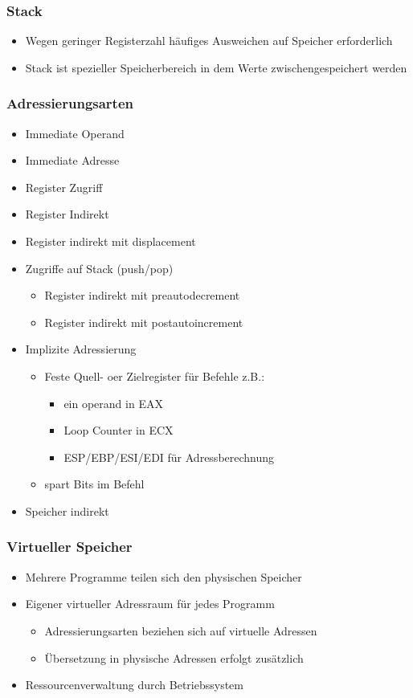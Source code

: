 \subsubsection{Stack}
\begin{itemize}
	\item Wegen geringer Registerzahl häufiges Ausweichen auf Speicher erforderlich
	\item Stack ist spezieller Speicherbereich in dem Werte zwischengespeichert werden
\end{itemize}
\subsubsection{Adressierungsarten}
\begin{itemize}
	\item Immediate Operand
	\item Immediate Adresse
	\item Register Zugriff
	\item Register Indirekt
	\item Register indirekt mit displacement
	\item Zugriffe auf Stack (push/pop)
	\begin{itemize}
		\item Register indirekt mit preautodecrement
		\item Register indirekt mit postautoincrement
	\end{itemize}
	\item Implizite Adressierung
	\begin{itemize}
		\item Feste Quell- oer Zielregister für Befehle z.B.:
		\begin{itemize}
			\item ein operand in EAX
			\item Loop Counter in ECX
			\item ESP/EBP/ESI/EDI für Adressberechnung
		\end{itemize}
		\item spart Bits im Befehl
	\end{itemize}
	\item Speicher indirekt
\end{itemize}
\subsubsection{Virtueller Speicher}
\begin{itemize}
	\item Mehrere Programme teilen sich den physischen Speicher
	\item Eigener virtueller Adressraum für jedes Programm
	\begin{itemize}
		\item Adressierungsarten beziehen sich auf virtuelle Adressen
		\item Übersetzung in physische Adressen erfolgt zusätzlich
	\end{itemize}
	\item Ressourcenverwaltung durch Betriebssystem
\end{itemize}
